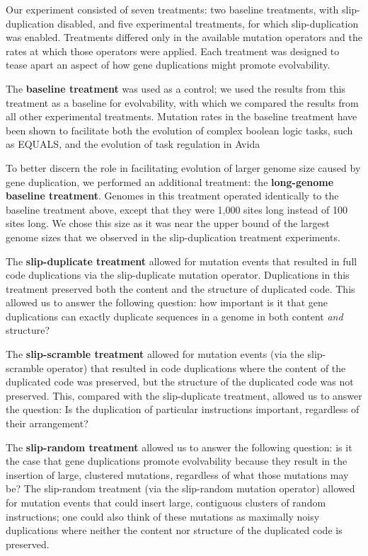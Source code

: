 % 

Our experiment consisted of seven treatments: two baseline treatments, with slip-duplication disabled, and five experimental treatments, for which slip-duplication was enabled.
Treatments differed only in the available mutation operators and the rates at which those operators were applied.
Each treatment was designed to tease apart an aspect of how gene duplications might promote evolvability.

The \textbf{baseline treatment} was used as a control; we used the results from this treatment as a baseline for evolvability, with which we compared the results from all other experimental treatments. Mutation rates in the baseline treatment have been shown to facilitate both the evolution of complex boolean logic tasks, such as EQUALS, and the evolution of task regulation in Avida \citep{lenski2003evolutionary, Lalejini:2016plasticity}

To better discern the role in facilitating evolution of larger genome size caused by gene duplication, we performed an additional treatment: the \textbf{long-genome baseline treatment}.
Genomes in this treatment operated identically to the baseline treatment above, except that they were 1,000 sites long instead of 100 sites long.
We chose this size as it was near the upper bound of the largest genome sizes that we observed in the slip-duplication treatment experiments.

The \textbf{slip-duplicate treatment} allowed for mutation events that resulted in full code duplications via the slip-duplicate mutation operator. Duplications in this treatment preserved both the content and the structure of duplicated code. This allowed us to answer the following question: how important is it that gene duplications can exactly duplicate sequences in a genome in both content \textit{and} structure?

The \textbf{slip-scramble treatment} allowed for mutation events (via the slip-scramble operator) that resulted in code duplications where the content of the duplicated code was preserved, but the structure of the duplicated code was not preserved. This, compared with the slip-duplicate treatment, allowed us to answer the question: Is the duplication of particular instructions important, regardless of their arrangement?

The \textbf{slip-random treatment} allowed us to answer the following question: is it the case that gene duplications promote evolvability because they result in the insertion of large, clustered mutations, regardless of what those mutations may be? The slip-random treatment (via the slip-random mutation operator) allowed for mutation events that could insert large, contiguous clusters of random instructions; one could also think of these mutations as maximally noisy duplications where neither the content nor structure of the duplicated code is preserved.

